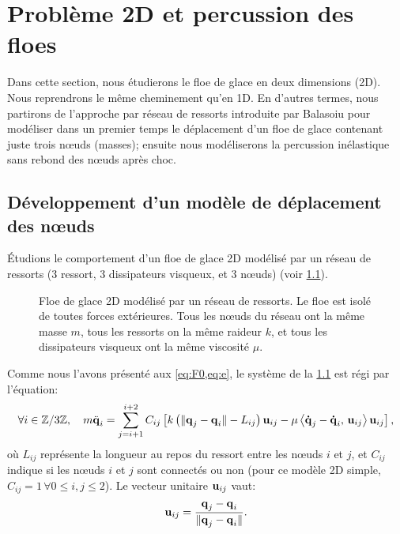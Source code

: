 
\chapter{Problème 2D et percussion des floes} %

\label{Chapter4} %




Dans cette section, nous étudierons le floe de glace en deux dimensions (2D). Nous reprendrons le même cheminement qu'en 1D. En d'autres termes, nous partirons de l'approche par réseau de ressorts introduite par Balasoiu pour modéliser dans un premier temps le déplacement d'un floe de glace contenant juste trois n\oe{}uds (masses); ensuite nous modéliserons la percussion inélastique sans rebond des n\oe{}uds après choc.







\section{Développement d'un modèle de déplacement des n\oe{}uds}








Étudions le comportement d'un floe de glace 2D modélisé par un réseau de ressorts (3 ressort, 3 dissipateurs visqueux, et 3 n\oe{}uds) (voir \cref{fig:deplacement2d}).
\begin{figure}[!h]
    \centering
    \caption{Floe de glace 2D modélisé par un réseau de ressorts. Le floe est isolé de toutes forces extérieures. Tous les n\oe{}uds du réseau ont la même masse $m$, tous les ressorts on la même raideur $k$, et tous les dissipateurs visqueux ont la même viscosité $\mu$.}
    \label{fig:deplacement2d}
\end{figure}


\noindent Comme nous l'avons présenté aux \cref{eq:F0,eq:e}, le système de la \cref{fig:deplacement2d} est régi par l'équation:
\begin{align} \label{eq:eprime2}
    \forall i \in \mathbb{Z}/3\mathbb{Z}, \quad m \ddot{\bm{\mathrm{q}}}_i = \sum_{j=i+1}^{i+2}C_{ij} \left[  k \left( \Vert \bm{\mathrm{q}}_j - \bm{\mathrm{q}}_i \Vert - L_{ij} \right) \bm{\mathrm{u}}_{ij} - \mu \left\langle \bm{\mathrm{\dot{q}}}_j - \bm{\mathrm{\dot{q}}}_i, \, \bm{\mathrm{u}}_{ij}  \right\rangle  \bm{\mathrm{u}}_{ij}  \right]  , 
\end{align}
où $L_{ij}$ représente la longueur au repos du ressort entre les n\oe{}uds $i$ et $j$, et $C_{ij}$ indique si les n\oe{}uds $i$ et $j$ sont connectés ou non (pour ce modèle 2D simple, $C_{ij} = 1 \, \forall 0 \leq i,j \leq 2$). Le vecteur unitaire $\bm{\mathrm{u}}_{ij}$ vaut:
$$
\bm{\mathrm{u}}_{ij} = \frac{\bm{\mathrm{q}}_j - \bm{\mathrm{q}}_i}{\Vert \bm{\mathrm{q}}_j - \bm{\mathrm{q}}_i \Vert}.
$$



